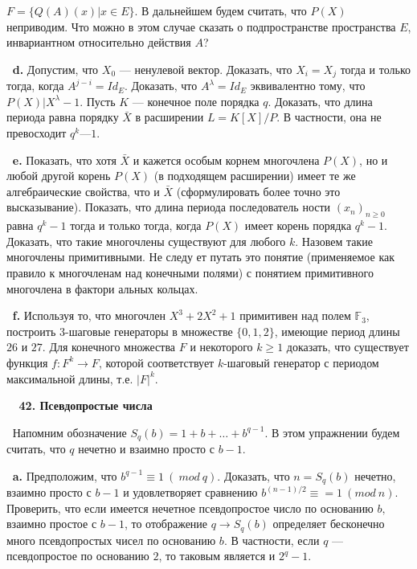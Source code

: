 \documentclass{../../template/mai_book}
\begin{document}
\noindent $F = \{Q(A)(x) | x \in E\}$. В дальнейшем будем считать, что $P(X)$ неприводим. Что можно в этом случае сказать о подпространстве про­странства $E$, инвариантном относительно действия $A$?

$\:$\newline \indent
\textbf{d.} Допустим, что $X_0$ — ненулевой вектор. Доказать, что $X_i = X_j$ тогда и только тогда, когда $A^{j-i} = Id_E$. Доказать, что $A^\lambda = Id_E$ эквивалентно тому, что $P(X) | X^\lambda - 1$. Пусть $K$ — конечное поле порядка $q$. Доказать, что длина периода равна порядку $\bar{X}$ в расширении $L = K[X]/P$. В частности, она не превосходит $q^k — 1$.

$\:$\newline \indent
\textbf{e.} Показать, что хотя $\bar{X}$ и кажется особым корнем многочлена
$P(X)$, но и любой другой корень $P(X)$ (в подходящем расширении)
имеет те же алгебраические свойства, что и $\bar{X}$ (сформулировать более
точно это высказывание). Показать, что длина периода последователь­
ности $(x_n)_{n \geq 0}$ равна $q^k - 1$ тогда и только тогда, когда $P(X)$ имеет
корень порядка $q^k - 1$. Доказать, что такие многочлены существуют
для любого $k$. Назовем такие многочлены примитивными. Не следу­
ет путать это понятие (применяемое как правило к многочленам над
конечными полями) с понятием примитивного многочлена в фактори­
альных кольцах.

$\:$\newline \indent
\textbf{f.} Используя то, что многочлен $X^3 + 2X^2 + 1$ примитивен над полем
$\mathds{F}_3$, построить 3-шаговые генераторы в множестве $\{0,1,2\}$, имеющие
период длины $26$ и $27$. Для конечного множества $F$ и некоторого $k \geq 1$ доказать, что существует функция $f : F^k \rightarrow F$, которой соответствует
$k$-шаговый генератор с периодом максимальной длины, т.е. $|F|^k$.

$\:$\newline
$\:$\newline
\textbf{42. Псевдопростые числа}

$\:$\newline \indent
Напомним обозначение $S_q(b)=1+b+\dots+b^{q-1}$. В этом упражнении
будем считать, что $q$ нечетно и взаимно просто с $b - 1$.

$\:$\newline\indent
\textbf{a.} Предположим, что $b^{q - 1} \equiv 1\:(\:mod\:q)$. Доказать, что $n = S_q(b)$ нечетно, взаимно просто с $b -1$ и удовлетворяет сравнению $b^{(n- 1)/2} \equiv = 1\:(mod\:n)$. Проверить, что если имеется нечетное псевдопростое число по основанию $b,$ взаимно простое с $b - 1$, то отображение $q \rightarrow S_q(b)$ определяет бесконечно много псевдопростых чисел по основанию $b$. В частности, если $q$ — псевдопростое по основанию $2$, то таковым явля­ется и $2^q- 1$.
\end{document}
